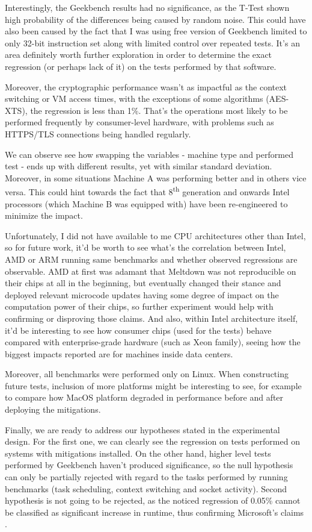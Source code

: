 \documentclass{csfourzero}
\begin{document}
Interestingly, the Geekbench results had no significance, as the T-Test shown high probability of the differences being caused by random noise. This could have also been caused by the fact that I was using free version of Geekbench limited to only 32-bit instruction set along with limited control over repeated tests. It's an area definitely worth further exploration in order to determine the exact regression (or perhaps lack of it) on the tests performed by that software.  

Moreover, the cryptographic performance wasn't as impactful as the context switching or VM access times, with the exceptions of some algorithms (AES-XTS), the regression is less than 1\%. That's the operations most likely to be performed frequently by consumer-level hardware, with problems such as HTTPS/TLS connections being handled regularly.

We can observe see how swapping the variables - machine type and performed test - ends up with different results, yet with similar standard deviation. Moreover, in some situations Machine A was performing better and in others vice versa. This could hint towards the fact that 8\textsuperscript{th} generation and onwards Intel processors (which Machine B was equipped with) have been re-engineered to minimize the impact.  

Unfortunately, I did not have available to me CPU architectures other than Intel, so for future work, it'd be worth to see what's the correlation between Intel, AMD or ARM running same benchmarks and whether observed regressions are observable. AMD at first was adamant that Meltdown was not reproducible on their chips at all in the beginning, but eventually changed their stance \cite{amdsec} and deployed relevant microcode updates having some degree of impact on the computation power of their chips, so further experiment would help with confirming or disproving those claims. And also, within Intel architecture itself, it'd be interesting to see how consumer chips (used for the tests) behave compared with enterprise-grade hardware (such as Xeon family), seeing how the biggest impacts reported are for machines inside data centers.

Moreover, all benchmarks were performed only on Linux. When constructing future tests, inclusion of more platforms might be interesting to see, for example to compare how MacOS platform degraded in performance before and after deploying the mitigations.

Finally, we are ready to address our hypotheses stated in the experimental design. For the first one, we can clearly see the regression on tests performed on systems with mitigations installed. On the other hand, higher level tests performed by Geekbench haven't produced significance, so the null hypothesis can only be partially rejected with regard to the tasks performed by running benchmarks (task scheduling, context switching and socket activity). Second hypothesis is not going to be rejected, as the noticed regression of 0.05\% cannot be classified as significant increase in runtime, thus confirming Microsoft's claims \cite{myerson2018understanding}.
\end{document}
